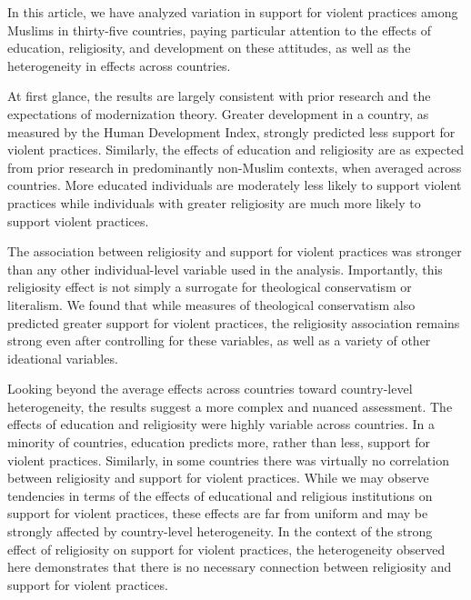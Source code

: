 \documentclass[10pt,letterpaper]{article}
\begin{document}
In this article, we have analyzed variation in support for violent
practices among Muslims in thirty-five countries, paying particular
attention to the effects of education, religiosity, and development on
these attitudes, as well as the heterogeneity in effects across
countries.

At first glance, the results are largely consistent with prior research
and the expectations of modernization theory. Greater development in a
country, as measured by the Human Development Index, strongly predicted
less support for violent practices. Similarly, the effects of education
and religiosity are as expected from prior research in predominantly
non-Muslim contexts, when averaged across countries. More educated
individuals are moderately less likely to support violent practices
while individuals with greater religiosity are much more likely to
support violent practices.

The association between religiosity and support for violent practices
was stronger than any other individual-level variable used in the
analysis. Importantly, this religiosity effect is not simply a surrogate
for theological conservatism or literalism. We found that while measures
of theological conservatism also predicted greater support for violent
practices, the religiosity association remains strong even after
controlling for these variables, as well as a variety of other
ideational variables.

Looking beyond the average effects across countries toward country-level
heterogeneity, the results suggest a more complex and nuanced
assessment. The effects of education and religiosity were highly
variable across countries. In a minority of countries, education
predicts more, rather than less, support for violent practices.
Similarly, in some countries there was virtually no correlation between
religiosity and support for violent practices. While we may observe
tendencies in terms of the effects of educational and religious
institutions on support for violent practices, these effects are far
from uniform and may be strongly affected by country-level
heterogeneity. In the context of the strong effect of religiosity on
support for violent practices, the heterogeneity observed here
demonstrates that there is no necessary connection between religiosity
and support for violent practices.
\end{document}
